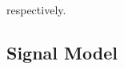 \documentclass[10pt,technote]{IEEEtran}
\newcommand{\1}{\mathbbm{1}}
\begin{document}
respectively. %

\subsection{Signal Model}
\end{document}
